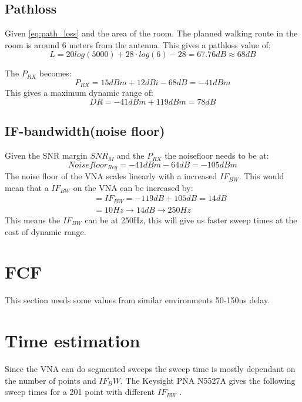 \subsection{Pathloss}
Given \autoref{eq:path_loss} and the area of the room. The planned walking route in the room is around 6 meters from the antenna. This gives a pathloss value of:
\begin{equation}
L = 20log (5000) + 28 \cdot log(6)-28 = 67.76dB \approx 68dB
\label{eq:path_loss}
\end{equation}

The $P_{RX}$ becomes:
\begin{equation}
P_{RX} = 15dBm + 12dBi - 68dB = -41dBm
\end{equation}
This gives a maximum dynamic range of:
\begin{equation}
DR = -41dBm+119dBm = 78dB
\end{equation}


\subsection{IF-bandwidth(noise floor)}
Given the SNR margin $SNR_{M}$ and the $P_{RX}$ the noisefloor needs to be at:
\begin{equation}
Noisefloor_{Req} = -41dBm-64dB = -105dBm 
\end{equation}
The noise floor of the \gls{VNA} scales linearly with a increased $IF_{BW}$\citep{PNA_scale}. This would mean that a $IF_{BW}$ on the \gls{VNA} can be increased by:
\begin{equation}
\begin{split}
&= IF_{BW} = -119dB+105dB = 14dB \\
          \quad &= 10Hz \rightarrow 14dB \rightarrow 250Hz
\end{split}
\end{equation}
This means the $IF_{BW}$ can be at 250Hz, this will give us faster sweep times at the cost of dynamic range.
\section{FCF}
This section needs some values from similar environments 50-150ns delay.
\section{Time estimation}
Since the \gls{VNA} can do segmented sweeps the sweep time is mostly dependant on the number of points and $IF_BW$.
The Keysight PNA N5527A gives the following sweep times for a 201 point with different $IF_{BW}$ \citep{Key_PNA}.

